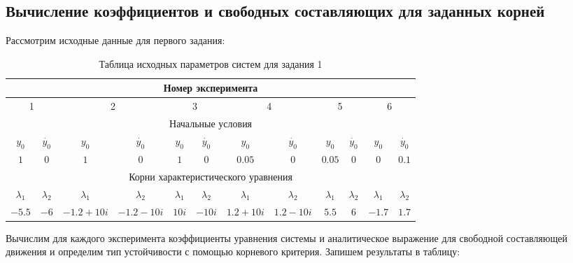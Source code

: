 \documentclass[a4paper, 12pt]{article}
\begin{document}
\subsection{Вычисление коэффициентов и свободных составляющих для заданных корней}
Рассмотрим исходные данные для первого задания:
\newline
\begin{table}[H]
\centering
\caption{Таблица исходных параметров систем для задания 1}
\label{tab:1}
\begin{tabular}{|c|c|c|c|c|c|c|c|c|c|c|c|}
    \hline
    \multicolumn{12}{|c|}{Номер эксперимента} \\ \hline
    \multicolumn{2}{|c|}{1} & \multicolumn{2}{|c|}{2} & \multicolumn{2}{|c|}{3} & \multicolumn{2}{|c|}{4} & \multicolumn{2}{|c|}{5} & \multicolumn{2}{|c|}{6} \\ \hline
    \multicolumn{12}{|c|}{Начальные условия} \\ \hline
    $y_0$ & $\dot{y_0}$ & $y_0$ & $\dot{y_0}$ & $y_0$ & $\dot{y_0}$ & $y_0$ & $\dot{y_0}$ & $y_0$ & $\dot{y_0}$ & $y_0$ & $\dot{y_0}$ \\ \hline
    $1$ & $0$ & $1$ & $0$ & $1$ & $0$ & $0.05$ & $0$ & $0.05$ & $0$ & $0$ & $0.1$ \\ \hline
    \multicolumn{12}{|c|}{Корни характеристического уравнения} \\ \hline
    $\lambda_1$ & $\lambda_2$ & $\lambda_1$ & $\lambda_2$ & $\lambda_1$ & $\lambda_2$ & $\lambda_1$ & $\lambda_2$ & $\lambda_1$ & $\lambda_2$ & $\lambda_1$ & $\lambda_2$ \\ \hline
    $-5.5$ & $-6$ & $-1.2 + 10i$ & $-1.2 - 10i$ & $10i$ & $-10i$ & $1.2 + 10i$ & $1.2 - 10i$ & $5.5$ & $6$ & $-1.7$ & $1.7$ \\ \hline
\end{tabular}
\end{table}
Вычислим для каждого эксперимента коэффициенты уравнения системы и аналитическое выражение для свободной составляющей движения и определим тип устойчивости с помощью корневого критерия. Запишем результаты в таблицу:
\newline
\renewcommand{\arraystretch}{1.3}
\end{document}
